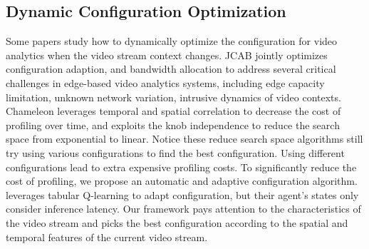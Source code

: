 \subsection{Dynamic Configuration Optimization}
Some papers study how to dynamically optimize the configuration for video analytics when the video stream context changes. JCAB \cite{wang2020jcab} jointly optimizes configuration adaption, and bandwidth allocation to address several critical challenges in edge-based video analytics systems, including edge capacity limitation, unknown network variation, intrusive dynamics of video contexts. Chameleon \cite{jiang2018chameleon} leverages temporal and spatial correlation to decrease the cost of profiling over time, and exploits the knob independence to reduce the search space from exponential to linear. Notice these reduce search space algorithms still try using various configurations to find the best configuration. Using different configurations lead to extra expensive profiling costs. To significantly reduce the cost of profiling, we propose an automatic and adaptive configuration algorithm. \cite{argerich2019orchestration} leverages tabular Q-learning to adapt configuration, but their agent's states only consider inference latency. Our framework pays attention to the characteristics of the video stream and picks the best configuration according to the spatial and temporal features of the current video stream.



